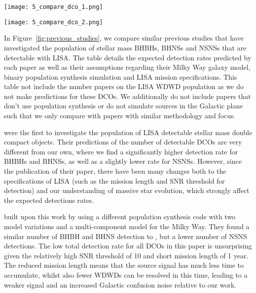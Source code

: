 \begin{figure*}[p]
    \centering
    \texttt{[image: 5\_compare\_dco\_1.png]}

    \vspace{0.5cm}

    \texttt{[image: 5\_compare\_dco\_2.png]}
    \caption{A table comparing previous studies of a similar nature to this work. The works listed in the table are \citet{Nelemans+2001,Belczynski+2010,Liu+2014,Lamberts+2018,Lau+2020,Breivik+2020,Sesana+2020}.}
    \label{fig:previous_studies}
\end{figure*}

In Figure~\ref{fig:previous_studies}, we compare similar previous studies that have investigated the population of stellar mass BHBHs, BHNSs and NSNSs that are detectable with LISA. The table details the expected detection rates predicted by each paper as well as their assumptions regarding their Milky Way galaxy model, binary population synthesis simulation and LISA mission specifications. This table not include the number papers on the LISA WDWD population as we do not make predictions for these DCOs. We additionally do not include papers that don't use population synthesis or do not simulate sources in the Galactic plane \citep[e.g.][]{Andrews+2020, Kremer+2018} such that we only compare with papers with similar methodology and focus.

\citet{Nelemans+2001} were the first to investigate the population of LISA detectable stellar mass double compact objects. Their predictions of the number of detectable DCOs are very different from our own, where we find a significantly higher detection rate for BHBHs and BHNSs, as well as a slightly lower rate for NSNSs. However, since the publication of their paper, there have been many changes both to the specifications of LISA (such as the mission length and SNR threshold for detection) and our understanding of massive star evolution, which strongly affect the expected detections rates.

\citet{Belczynski+2010} built upon this work by using a different population synthesis code with two model variations and a multi-component model for the Milky Way. They found a similar number of BHBH and BHNS detection to \citet{Nelemans+2001}, but a lower number of NSNS detections. The low total detection rate for all DCOs in this paper is unsurprising given the relatively high SNR threshold of 10 and short mission length of 1 year. The reduced mission length means that the source signal has much less time to accumulate, whilst also fewer WDWDs can be resolved in this time, leading to a weaker signal and an increased Galactic confusion noise relative to our work.

